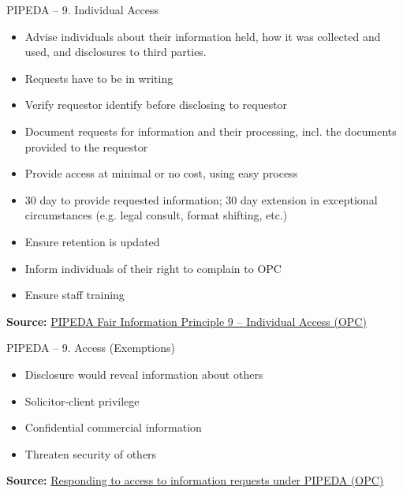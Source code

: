 \documentclass[ignorenonframetext,xcolor=x11names]{beamer}
\begin{document}
\begin{frame}[label=full]{PIPEDA -- 9. Individual Access}
\begin{itemize}
   \item Advise individuals about their information held, how it was collected and used, and disclosures to third parties. 
   \item Requests have to be in writing
   \item Verify requestor identify before disclosing to requestor
   \item Document requests for information and their processing, incl. the documents provided to the requestor
   \item Provide access at minimal or no cost, using easy process
   \item 30 day to provide requested information; 30 day extension in exceptional circumstances (e.g. legal consult, format shifting, etc.)
   \item Ensure retention is updated
   \item Inform individuals of their right to complain to OPC
   \item Ensure staff training
\end{itemize}

\vspace{\baselineskip}
\scriptsize \textbf{Source:} \href{https://www.priv.gc.ca/en/privacy-topics/privacy-laws-in-canada/the-personal-information-protection-and-electronic-documents-act-pipeda/p_principle/principles/p_access/}{PIPEDA Fair Information Principle 9 -- Individual Access (OPC)}
\end{frame}

\begin{frame}[label=full]{PIPEDA -- 9. Access \small (Exemptions)}
\begin{itemize}
   \item Disclosure would reveal information about others
   \item Solicitor-client privilege
   \item Confidential commercial information
   \item Threaten security of others
\end{itemize}

\vspace{\baselineskip}
\scriptsize \textbf{Source:} \href{https://www.priv.gc.ca/en/privacy-topics/accessing-personal-information/obligations-for-organizations/02_05_d_54_ati_02/}{Responding to access to information requests under PIPEDA (OPC)}
\end{frame}
\end{document}
